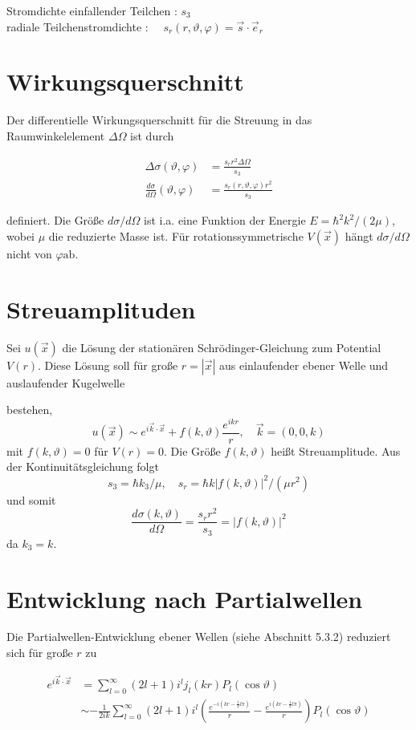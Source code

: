 \documentclass[10pt, letterpaper]{article}
\begin{document}
Stromdichte einfallender Teilchen : $s_{3}$\\
radiale Teilchenstromdichte : $\quad s_{r}(r, \vartheta, \varphi)=\vec{s} \cdot \vec{e}_{r}$

\section*{Wirkungsquerschnitt}
Der differentielle Wirkungsquerschnitt für die Streuung in das Raumwinkelelement $\Delta \Omega$ ist durch

$$
\begin{aligned}
\Delta \sigma(\vartheta, \varphi) & =\frac{s_{r} r^{2} \Delta \Omega}{s_{3}} \\
\frac{d \sigma}{d \Omega}(\vartheta, \varphi) & =\frac{s_{r}(r, \vartheta, \varphi) r^{2}}{s_{3}}
\end{aligned}
$$

definiert. Die Größe $d \sigma / d \Omega$ ist i.a. eine Funktion der Energie $E=\hbar^{2} k^{2} /(2 \mu)$, wobei $\mu$ die reduzierte Masse ist. Für rotationssymmetrische $V(\vec{x})$ hängt $d \sigma / d \Omega$ nicht von $\varphi \mathrm{ab}$.

\section*{Streuamplituden}
Sei $u(\vec{x})$ die Lösung der stationären Schrödinger-Gleichung zum Potential $V(r)$. Diese Lösung soll für große $r=|\vec{x}|$ aus einlaufender ebener Welle und auslaufender Kugelwelle

bestehen,
$$
u(\vec{x}) \sim e^{i \vec{k} \cdot \vec{x}}+f(k, \vartheta) \frac{e^{i k r}}{r}, \quad \vec{k}=(0,0, k)
$$
mit $f(k, \vartheta)=0$ für $V(r)=0$. Die Größe $f(k, \vartheta)$ heißt Streuamplitude. Aus der Kontinuitätsgleichung folgt
$$
s_{3}=\hbar k_{3} / \mu, \quad s_{r}=\hbar k|f(k, \vartheta)|^{2} /\left(\mu r^{2}\right)
$$
und somit
$$
\frac{d \sigma(k, \vartheta)}{d \Omega}=\frac{s_{r} r^{2}}{s_{3}}=|f(k, \vartheta)|^{2}
$$
da $k_{3}=k$.

\section*{Entwicklung nach Partialwellen}
Die Partialwellen-Entwicklung ebener Wellen (siehe Abschnitt 5.3.2) reduziert sich für große $r$ zu

$$
\begin{aligned}
e^{i \vec{k} \cdot \vec{x}} & =\sum_{l=0}^{\infty}(2 l+1) i^{l} j_{l}(k r) P_{l}(\cos \vartheta) \\
& \sim-\frac{1}{2 i k} \sum_{l=0}^{\infty}(2 l+1) i^{l}\left(\frac{e^{-i\left(k r-\frac{1}{2} l \pi\right)}}{r}-\frac{e^{i\left(k r-\frac{1}{2} l \pi\right)}}{r}\right) P_{l}(\cos \vartheta)
\end{aligned}
$$
\end{document}
